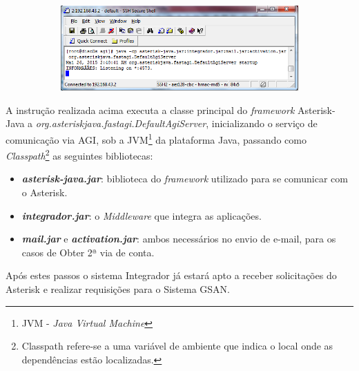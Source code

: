 \begin{figure}[H]
	\centering
	\caption{\textbf{Executando o sistema Integrador.}}	
	\label{figura:executarIntegrador}
	\begin{subfigure}[H]{\textwidth}
		\centering
		\includegraphics{figuras/executar_integrador.png}
	\end{subfigure}
\end{figure}


A instrução realizada acima executa a classe principal do \textit{framework} Asterisk-Java a \textit{ org.asteriskjava.fastagi.DefaultAgiServer}, inicializando o serviço de comunicação via AGI, sob a JVM\footnote{JVM - \textit{Java Virtual Machine}} da plataforma Java, passando como \textit{Classpath}\footnote{Classpath refere-se a uma variável de ambiente que indica o local onde as dependências estão localizadas.} as seguintes bibliotecas: 

\begin{itemize}
	\item \textbf{\textit{asterisk-java.jar}}: biblioteca do \textit{framework} utilizado para se comunicar com o Asterisk.
	\item \textbf{\textit{integrador.jar}}: o \textit{Middleware} que integra as aplicações.
	\item \textbf{\textit{mail.jar}} e \textbf{\textit{activation.jar}}: ambos necessários no envio de e-mail, para os casos de Obter 2ª via de conta.	
\end{itemize}

Após estes passos o sistema Integrador já estará apto a receber solicitações do Asterisk e realizar requisições para o Sistema GSAN.
